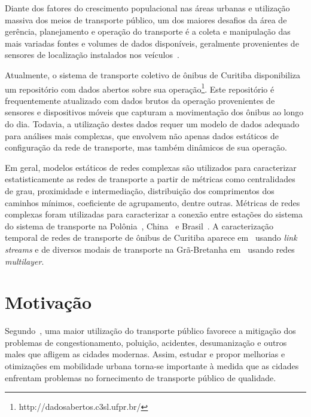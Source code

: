 Diante dos fatores do crescimento populacional nas áreas urbanas e utilização massiva dos meios de transporte público, um dos maiores desafios da área de gerência, planejamento e operação do transporte é a coleta e manipulação das mais variadas fontes e volumes de dados disponíveis, geralmente provenientes de sensores de localização instalados nos veículos~\cite{wes:17}. 

Atualmente, o sistema de transporte coletivo de ônibus de Curitiba disponibiliza um repositório com dados abertos sobre sua operação\footnote{http://dadosabertos.c3sl.ufpr.br/}. Este repositório é frequentemente atualizado com dados brutos da operação provenientes de sensores e dispositivos móveis que capturam a movimentação dos ônibus ao longo do dia. Todavia, a utilização destes dados requer um modelo de dados adequado para análises mais complexas, que envolvem não apenas dados estáticos de configuração da rede de transporte, mas também dinâmicos de sua operação.
 

\textcolor{courb2020}{
Em geral, modelos estáticos de redes complexas são utilizados para caracterizar estatisticamente as redes de transporte a partir de métricas como centralidades de grau, proximidade e intermediação, distribuição dos comprimentos dos caminhos mínimos, coeficiente de agrupamento, dentre outras. Métricas de redes complexas foram utilizadas para caracterizar a conexão entre estações do sistema do sistema de transporte na Polônia~\cite{Sienkiewicz2005}, China~\cite{Xu2013} e Brasil~\cite{Izawa2017}. A caracterização temporal de redes de transporte de ônibus de Curitiba aparece em~\cite{curz:19} usando \emph{link streams} e de diversos modais de transporte na Grã-Bretanha em~\cite{Gallotti2015} usando redes \emph{multilayer}.
}



\section{Motivação}

\textcolor{courb2020}{
Segundo~\cite{fer:04}, uma maior utilização do transporte público favorece a mitigação dos problemas de congestionamento, poluição, acidentes, desumanização e outros males que afligem as cidades modernas. 
Assim, estudar e propor melhorias e otimizações em mobilidade urbana torna-se importante à medida que as cidades enfrentam problemas no fornecimento de transporte público de qualidade.
}


